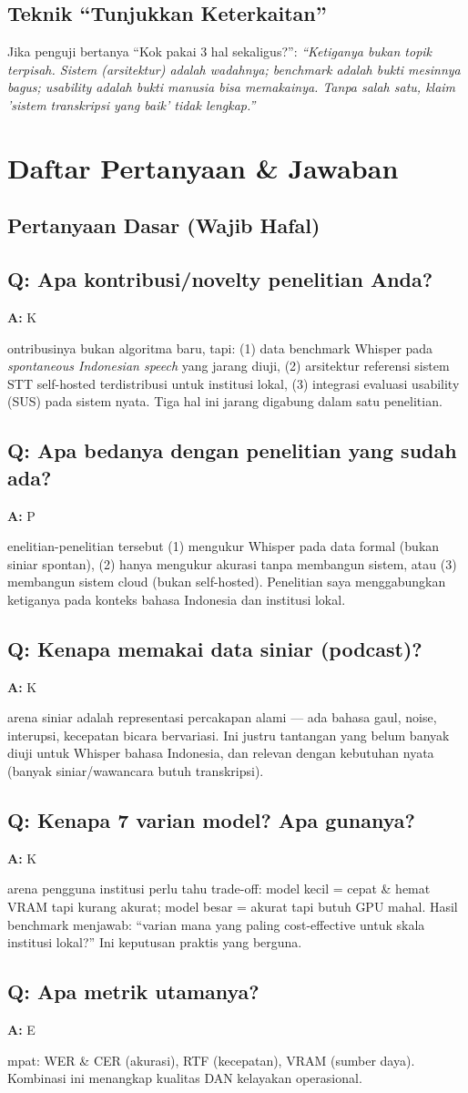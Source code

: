 \documentclass[11pt,a4paper]{article}
\newcommand{\qa}[2]{%
  \subsection*{\color{accent} Q: #1}%
  \textbf{A:} #2\par\vspace{0.6em}%
}
\begin{document}
\subsection{Teknik ``Tunjukkan Keterkaitan''}
Jika penguji bertanya ``Kok pakai 3 hal sekaligus?'':
\emph{``Ketiganya bukan topik terpisah. Sistem (arsitektur) adalah wadahnya; benchmark adalah bukti mesinnya bagus; usability adalah bukti manusia bisa memakainya. Tanpa salah satu, klaim 'sistem transkripsi yang baik' tidak lengkap.''}

\section{Daftar Pertanyaan \& Jawaban}

\subsection{Pertanyaan Dasar (Wajib Hafal)}

\qa{Apa kontribusi/novelty penelitian Anda?}
Kontribusinya bukan algoritma baru, tapi: (1) data benchmark Whisper pada \emph{spontaneous Indonesian speech} yang jarang diuji, (2) arsitektur referensi sistem STT self-hosted terdistribusi untuk institusi lokal, (3) integrasi evaluasi usability (SUS) pada sistem nyata. Tiga hal ini jarang digabung dalam satu penelitian.

\qa{Apa bedanya dengan penelitian yang sudah ada?}
Penelitian-penelitian tersebut (1) mengukur Whisper pada data formal (bukan siniar spontan), (2) hanya mengukur akurasi tanpa membangun sistem, atau (3) membangun sistem cloud (bukan self-hosted). Penelitian saya menggabungkan ketiganya pada konteks bahasa Indonesia dan institusi lokal.

\qa{Kenapa memakai data siniar (podcast)?}
Karena siniar adalah representasi percakapan alami --- ada bahasa gaul, noise, interupsi, kecepatan bicara bervariasi. Ini justru tantangan yang belum banyak diuji untuk Whisper bahasa Indonesia, dan relevan dengan kebutuhan nyata (banyak siniar/wawancara butuh transkripsi).

\qa{Kenapa 7 varian model? Apa gunanya?}
Karena pengguna institusi perlu tahu trade-off: model kecil = cepat \& hemat VRAM tapi kurang akurat; model besar = akurat tapi butuh GPU mahal. Hasil benchmark menjawab: ``varian mana yang paling cost-effective untuk skala institusi lokal?'' Ini keputusan praktis yang berguna.

\qa{Apa metrik utamanya?}
Empat: WER \& CER (akurasi), RTF (kecepatan), VRAM (sumber daya). Kombinasi ini menangkap kualitas DAN kelayakan operasional.
\end{document}
